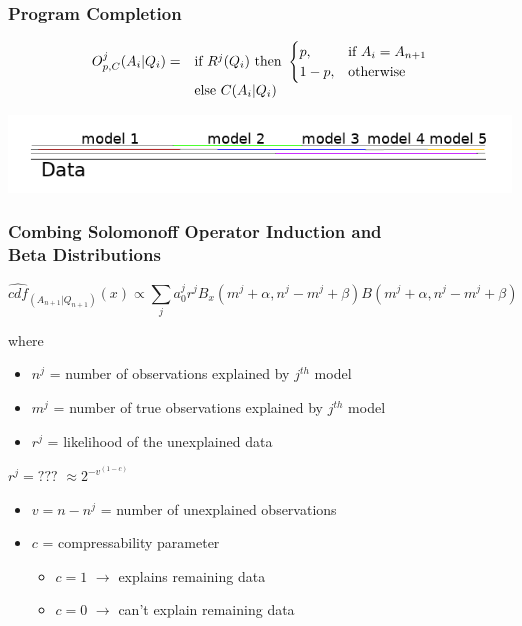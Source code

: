 \documentclass{beamer}
\begin{document}
\begin{frame}
  \frametitle{Program Completion}
  $$
  \begin{array}{@{}ll@{}}
    O^j_{p, C}(A_i|Q_i) = &
                            \text{if}\ R^j(Q_i)\ \text{then}\
                            \begin{cases}
                              p, & \text{if}\ A_i = A_{n+1} \\
                              1-p, & \text{otherwise}
                            \end{cases}\\
                          & \text{else}\ C(A_i|Q_i)
  \end{array}
  $$

  \includegraphics[scale=0.5]{images/data_line_completion.png}

\end{frame}

\begin{frame}
  \frametitle{Combing Solomonoff Operator Induction and\\
    Beta Distributions}

  $$
    \hat{cdf}_{(A_{n+1}|Q_{n+1})}(x) \propto \sum_j a_0^j r^j
    B_x(m^j+\alpha, n^j-m^j+\beta)
    B(m^j+\alpha, n^j-m^j+\beta)
  $$

  where
  \begin{itemize}
  \item $n^j$ = number of observations explained by $j^{th}$ model    
  \item $m^j$ = number of true observations explained by $j^{th}$ model
  \item $r^j$ = likelihood of the unexplained data
  \end{itemize}

  $r^j = ???$ \pause $\approx 2^{-v^{(1-c)}}$
  \begin{itemize}
  \item $v = n-n^j$ = number of unexplained observations
  \item $c$ = compressability parameter
    \begin{itemize}
    \item $c=1$ $\rightarrow$ explains remaining data%
    \item $c=0$ $\rightarrow$ can't explain remaining data
    \end{itemize}
  \end{itemize}
\end{frame}
\end{document}
